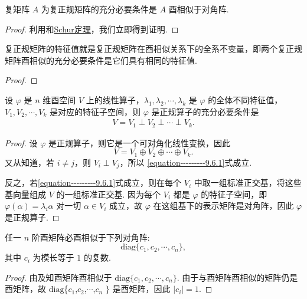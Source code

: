 \documentclass[../../main.tex]{subfiles}%
\begin{document}
\begin{theorem}\label{theorem:复正规矩阵等价于酉相似于对角阵的矩阵}
复矩阵 $A$ 为复正规矩阵的充分必要条件是 $A$ 酉相似于对角阵.
\end{theorem}
\begin{proof}

利用和\hyperref[theorem:Schur(舒尔)定理]{Schur定理}，我们立即得到证明.

\end{proof}

\begin{theorem}\label{theorem:复正规矩阵的特征值就是复正规矩阵在酉相似关系下的全系不变量}
复正规矩阵的特征值就是复正规矩阵在酉相似关系下的全系不变量，即两个复正规矩阵酉相似的充分必要条件是它们具有相同的特征值.
\end{theorem}
\begin{proof}



\end{proof}

\begin{proposition}
设 $\varphi$ 是 $n$ 维酉空间 $V$ 上的线性算子，$\lambda_1,\lambda_2,\cdots,\lambda_k$ 是 $\varphi$ 的全体不同特征值，$V_1,V_2,\cdots,V_k$ 是对应的特征子空间，则 $\varphi$ 是正规算子的充分必要条件是
\begin{align}\label{equation---------9.6.1}
V = V_1 \perp V_2 \perp \cdots \perp V_k. 
\end{align}
\end{proposition}
\begin{proof}

设 $\varphi$ 是正规算子，则它是一个可对角化线性变换，因此
\[
V = V_1 \oplus V_2 \oplus \cdots \oplus V_k.
\]
又从知道，若 $i \neq j$，则 $V_i \perp V_j$，所以 \eqref{equation---------9.6.1}式成立.

反之，若\eqref{equation---------9.6.1}式成立，则在每个 $V_i$ 中取一组标准正交基，将这些基向量组成 $V$ 的一组标准正交基. 因为每个 $V_i$ 都是 $\varphi$ 的特征子空间，即 $\varphi(\alpha) = \lambda_i\alpha$ 对一切 $\alpha \in V_i$ 成立，故 $\varphi$ 在这组基下的表示矩阵是对角阵，因此 $\varphi$ 是正规算子. 

\end{proof}

\begin{theorem}
任一 $n$ 阶酉矩阵必酉相似于下列对角阵:
\[
\mathrm{diag}\{c_1,c_2,\cdots,c_n\},
\]
其中 $c_i$ 为模长等于 $1$ 的复数.
\end{theorem}
\begin{proof}

由及知酉矩阵酉相似于 $\mathrm{diag}\{c_1,c_2,\cdots,c_n\}$. 由于与酉矩阵酉相似的矩阵仍是酉矩阵，故 $\mathrm{diag}$\{$c_1$,$c_2$,$\cdots$,$c_n$ $\}$ 是酉矩阵，因此 $|c_i| = 1$.

\end{proof}
\end{document}
